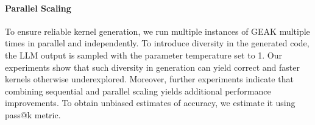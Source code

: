 \paragraph{Parallel Scaling}  

To ensure reliable kernel generation, we run multiple instances of GEAK multiple times in parallel and independently. To introduce diversity in the generated code, the LLM output is sampled with the parameter temperature set to 1. Our experiments show that such diversity in generation can yield correct and faster kernels otherwise underexplored. Moreover, further experiments indicate that combining sequential and parallel scaling yields additional performance improvements. To obtain unbiased estimates of accuracy, we estimate it using pass@k metric. 

